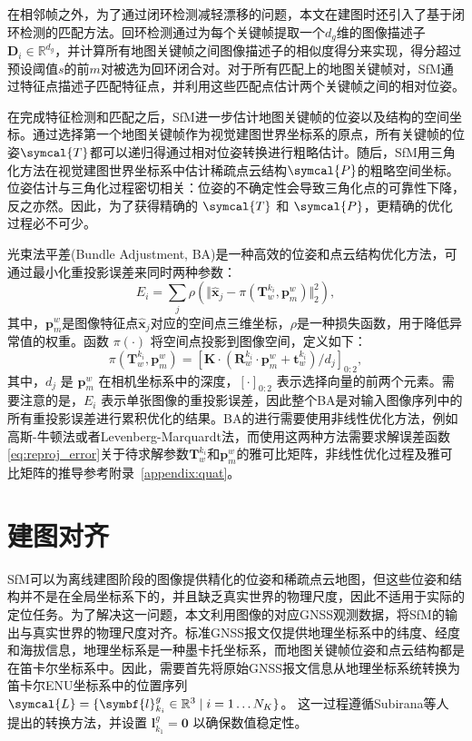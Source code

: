 在相邻帧之外，为了通过闭环检测减轻漂移的问题，本文在建图时还引入了基于闭环检测的匹配方法。回环检测通过为每个关键帧提取一个$d_g$维的图像描述子$\symbf{D}_i \in \mathbb{R}^{d_g}$，并计算所有地图关键帧之间图像描述子的相似度得分来实现，得分超过预设阈值$s$的前$m$对被选为回环闭合对。对于所有匹配上的地图关键帧对，SfM通过特征点描述子匹配特征点，并利用这些匹配点估计两个关键帧之间的相对位姿。

在完成特征检测和匹配之后，SfM进一步估计地图关键帧的位姿以及结构的空间坐标。通过选择第一个地图关键帧作为视觉建图世界坐标系的原点，所有关键帧的位姿$\symcal{T}$都可以递归得通过相对位姿转换进行粗略估计。随后，SfM用三角化方法在视觉建图世界坐标系中估计稀疏点云结构$\symcal{P}$的粗略空间坐标。位姿估计与三角化过程密切相关：位姿的不确定性会导致三角化点的可靠性下降，反之亦然。因此，为了获得精确的 $\symcal{T}$ 和 $\symcal{P}$，更精确的优化过程必不可少。

光束法平差(Bundle Adjustment, BA)是一种高效的位姿和点云结构优化方法，可通过最小化重投影误差来同时两种参数：
\begin{equation}
\label{eq:reproj_error}
E_i = \sum_{j}\rho(\Vert \hat{\symbf{x}}_j - \pi(\symbf{T}^{k_i}_w, \symbf{p}_{m}^{w}) \Vert ^2_2),
\end{equation}
其中，$\symbf{p}_{m}^{w}$是图像特征点$\hat{\symbf{x}}_j$对应的空间点三维坐标，$\rho$是一种损失函数，用于降低异常值的权重。函数 $\pi(\cdot)$ 将空间点投影到图像空间，定义如下：
\begin{equation}
\label{eq:proj_func}
\pi(\symbf{T}^{k_i}_w, \symbf{p}_{m}^{w}) = [\symbf{K}\cdot(\symbf{R}_w^{k_i}\cdot\symbf{p}_{m}^{w}+\symbf{t}_w^{k_i})/d_j]_{0:2},
\end{equation}
其中，$d_j$ 是 $\symbf{p}_{m}^{w}$ 在相机坐标系中的深度，$[\cdot]_{0:2}$ 表示选择向量的前两个元素。需要注意的是，$E_i$ 表示单张图像的重投影误差，因此整个BA是对输入图像序列中的所有重投影误差进行累积优化的结果。BA的进行需要使用非线性优化方法，例如高斯-牛顿法或者Levenberg-Marquardt法，而使用这两种方法需要求解误差函数\ref{eq:reproj_error}关于待求解参数$\symbf{T}^{k_i}_w$和$\symbf{p}_{m}^{w}$的雅可比矩阵，非线性优化过程及雅可比矩阵的推导参考附录~\ref{appendix:quat}。


\section{建图对齐}

SfM可以为离线建图阶段的图像提供精化的位姿和稀疏点云地图，但这些位姿和结构并不是在全局坐标系下的，并且缺乏真实世界的物理尺度，因此不适用于实际的定位任务。为了解决这一问题，本文利用图像的对应GNSS观测数据，将SfM的输出与真实世界的物理尺度对齐。标准GNSS报文仅提供地理坐标系中的纬度、经度和海拔信息，地理坐标系是一种墨卡托坐标系，而地图关键帧位姿和点云结构都是在笛卡尔坐标系中。因此，需要首先将原始GNSS报文信息从地理坐标系统转换为笛卡尔ENU坐标系中的位置序列
$\symcal{L} = \{\symbf{l}_{k_i}^g \in \mathbb{R}^3 \mid i=1 \ldots N_K \}$。
这一过程遵循Subirana等人 \cite{subirana2011transformations} 提出的转换方法，并设置
$\symbf{l}_{k_1}^g = \symbf{0}$ 以确保数值稳定性。

